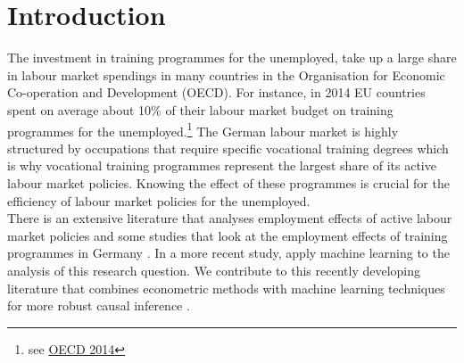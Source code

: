 \section{Introduction}

The investment in training programmes for the unemployed, take up a large share in labour market spendings in many countries in the Organisation for Economic Co-operation and Development (OECD). For instance, in 2014 EU countries spent on average about 10\% of their labour market budget on training programmes for the unemployed.\footnote{see \href{https://data.oecd.org/socialexp/public-spending-on-labour-markets.htm}{OECD 2014}} The German labour market is highly structured by occupations that require specific vocational training degrees which is why vocational training programmes represent the largest share of its active labour market policies. Knowing the effect of these programmes is crucial for the efficiency of labour market policies for the unemployed.  \\
There is an extensive literature that analyses employment effects of active labour market policies \citep[see][for overviews]{Kluve2010, Card2017} and some studies that look at the employment effects of training programmes in Germany \citep{Huber2018,Kruppe2018}. In a more recent study, \citet{Knaus2017} apply machine learning to the analysis of this research question. We contribute to this recently developing literature that combines econometric methods with machine learning techniques for more robust causal inference \citep{Belloni2014,Athey2015,Athey2017}.\\




